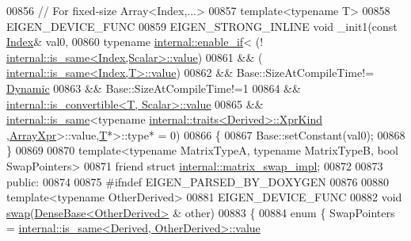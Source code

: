 \begin{DoxyCode}
00856     \textcolor{comment}{// For fixed-size Array<Index,...>}
00857     \textcolor{keyword}{template}<\textcolor{keyword}{typename} T>
00858     EIGEN\_DEVICE\_FUNC
00859     EIGEN\_STRONG\_INLINE \textcolor{keywordtype}{void} \_init1(\textcolor{keyword}{const} \hyperlink{namespace_eigen_a62e77e0933482dafde8fe197d9a2cfde}{Index}& val0,
00860                                     \textcolor{keyword}{typename} \hyperlink{struct_eigen_1_1internal_1_1enable__if}{internal::enable\_if}<    (!
      \hyperlink{struct_eigen_1_1internal_1_1is__same}{internal::is\_same<Index,Scalar>::value})
00861                                                                   && (
      \hyperlink{struct_eigen_1_1internal_1_1is__same}{internal::is\_same<Index,T>::value})
00862                                                                   && Base::SizeAtCompileTime!=
      \hyperlink{namespace_eigen_ad81fa7195215a0ce30017dfac309f0b2}{Dynamic}
00863                                                                   && Base::SizeAtCompileTime!=1
00864                                                                   && 
      \hyperlink{struct_eigen_1_1internal_1_1is__convertible}{internal::is\_convertible<T, Scalar>::value}
00865                                                                   && 
      \hyperlink{struct_eigen_1_1internal_1_1is__same}{internal::is\_same}<\textcolor{keyword}{typename} \hyperlink{struct_eigen_1_1internal_1_1traits}{internal::traits<Derived>::XprKind}
      ,\hyperlink{struct_eigen_1_1_array_xpr}{ArrayXpr}>::value,\hyperlink{group___sparse_core___module}{T}*>::type* = 0)
00866     \{
00867       Base::setConstant(val0);
00868     \}
00869     
00870     \textcolor{keyword}{template}<\textcolor{keyword}{typename} MatrixTypeA, \textcolor{keyword}{typename} MatrixTypeB, \textcolor{keywordtype}{bool} SwapPo\textcolor{keywordtype}{int}ers>
00871     \textcolor{keyword}{friend} \textcolor{keyword}{struct }\hyperlink{struct_eigen_1_1internal_1_1matrix__swap__impl}{internal::matrix\_swap\_impl};
00872 
00873   \textcolor{keyword}{public}:
00874     
00875 \textcolor{preprocessor}{#ifndef EIGEN\_PARSED\_BY\_DOXYGEN}
00876 
00880     \textcolor{keyword}{template}<\textcolor{keyword}{typename} OtherDerived>
00881     EIGEN\_DEVICE\_FUNC
00882     \textcolor{keywordtype}{void} \hyperlink{endian_8c_a3ca5ecd34b04d6a243c054ac3a57f68d}{swap}(\hyperlink{group___core___module_class_eigen_1_1_dense_base}{DenseBase<OtherDerived>} & other)
00883     \{
00884       \textcolor{keyword}{enum} \{ SwapPointers = \hyperlink{struct_eigen_1_1internal_1_1is__same}{internal::is\_same<Derived, OtherDerived>::value}

\end{DoxyCode}
